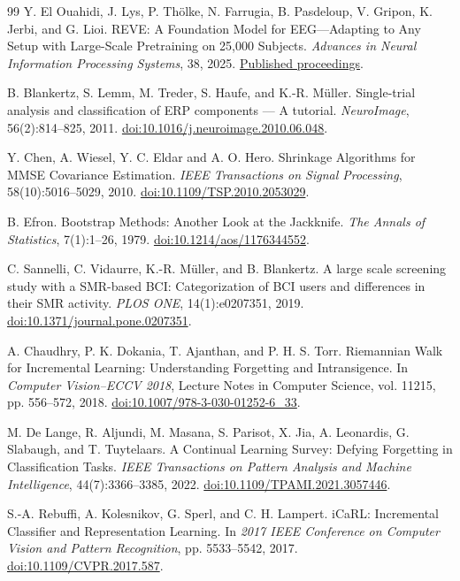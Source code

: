 \documentclass[11pt,a4paper]{article}
\begin{document}
\begin{thebibliography}{99}
Y. El Ouahidi, J. Lys, P. Th\"olke, N. Farrugia, B. Pasdeloup, V. Gripon, K. Jerbi, and G. Lioi.
REVE: A Foundation Model for EEG---Adapting to Any Setup with Large-Scale Pretraining on 25,000 Subjects.
\emph{Advances in Neural Information Processing Systems}, 38, 2025.
\href{https://proceedings.neurips.cc/paper_files/paper/2025/hash/20a917f77773ac0fa8bea2bdd6606b66-Abstract-Conference.html}{Published proceedings}.

B. Blankertz, S. Lemm, M. Treder, S. Haufe, and K.-R. M{\"u}ller.
Single-trial analysis and classification of ERP components --- A tutorial.
\emph{NeuroImage}, 56(2):814--825, 2011.
\href{https://doi.org/10.1016/j.neuroimage.2010.06.048}{doi:10.1016/j.neuroimage.2010.06.048}.

Y. Chen, A. Wiesel, Y. C. Eldar and A. O. Hero.
Shrinkage Algorithms for MMSE Covariance Estimation.
\emph{IEEE Transactions on Signal Processing}, 58(10):5016--5029, 2010.
\href{https://doi.org/10.1109/TSP.2010.2053029}{doi:10.1109/TSP.2010.2053029}.

B. Efron.
Bootstrap Methods: Another Look at the Jackknife.
\emph{The Annals of Statistics}, 7(1):1--26, 1979.
\href{https://doi.org/10.1214/aos/1176344552}{doi:10.1214/aos/1176344552}.

C. Sannelli, C. Vidaurre, K.-R. M{\"u}ller, and B. Blankertz.
A large scale screening study with a SMR-based BCI: Categorization of BCI users and differences in their SMR activity.
\emph{PLOS ONE}, 14(1):e0207351, 2019.
\href{https://doi.org/10.1371/journal.pone.0207351}{doi:10.1371/journal.pone.0207351}.

A. Chaudhry, P. K. Dokania, T. Ajanthan, and P. H. S. Torr.
Riemannian Walk for Incremental Learning: Understanding Forgetting and Intransigence.
In \emph{Computer Vision--ECCV 2018}, Lecture Notes in Computer Science, vol. 11215, pp. 556--572, 2018.
\href{https://doi.org/10.1007/978-3-030-01252-6_33}{doi:10.1007/978-3-030-01252-6\_33}.

M. De Lange, R. Aljundi, M. Masana, S. Parisot, X. Jia, A. Leonardis, G. Slabaugh, and T. Tuytelaars.
A Continual Learning Survey: Defying Forgetting in Classification Tasks.
\emph{IEEE Transactions on Pattern Analysis and Machine Intelligence}, 44(7):3366--3385, 2022.
\href{https://doi.org/10.1109/TPAMI.2021.3057446}{doi:10.1109/TPAMI.2021.3057446}.

S.-A. Rebuffi, A. Kolesnikov, G. Sperl, and C. H. Lampert.
iCaRL: Incremental Classifier and Representation Learning.
In \emph{2017 IEEE Conference on Computer Vision and Pattern Recognition}, pp. 5533--5542, 2017.
\href{https://doi.org/10.1109/CVPR.2017.587}{doi:10.1109/CVPR.2017.587}.


\end{thebibliography}
\end{document}
